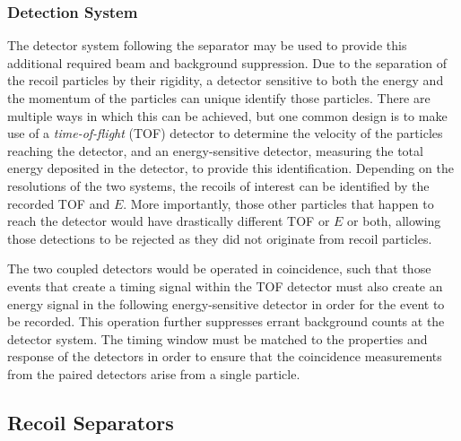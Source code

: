 \subsubsection{Detection System}

The detector system following the separator may be used to provide this
additional required beam and background suppression. Due to the separation of
the recoil particles by their rigidity, a detector sensitive to both the energy
and the momentum of the particles can unique identify those particles. There
are multiple ways in which this can be achieved, but one common design is to
make use of a \textit{time-of-flight} (TOF) detector to determine the velocity of the
particles reaching the detector, and an energy-sensitive detector, measuring
the total energy deposited in the detector, to provide this identification.
Depending on the resolutions of the two systems, the recoils of interest can
be identified by the recorded TOF and $E$. More importantly, those other
particles that happen to reach the detector would have drastically different
TOF or $E$ or both, allowing those detections to be rejected as they did not
originate from recoil particles.

The two coupled detectors would be operated in coincidence, such that those
events that create a timing signal within the TOF detector must also create an
energy signal in the following energy-sensitive detector in order for the
event to be recorded. This operation further suppresses errant background
counts at the detector system. The timing window must be matched to the
properties and response of the detectors in order to ensure that the
coincidence measurements from the paired detectors arise from a single
particle.


\subsection{Recoil Separators}
\label{sec:prevwork}


